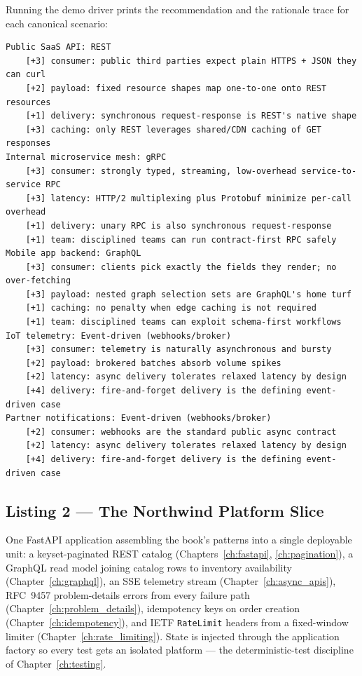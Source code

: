 Running the demo driver prints the recommendation and the rationale trace
for each canonical scenario:

\begin{verbatim}
Public SaaS API: REST
    [+3] consumer: public third parties expect plain HTTPS + JSON they can curl
    [+2] payload: fixed resource shapes map one-to-one onto REST resources
    [+1] delivery: synchronous request-response is REST's native shape
    [+3] caching: only REST leverages shared/CDN caching of GET responses
Internal microservice mesh: gRPC
    [+3] consumer: strongly typed, streaming, low-overhead service-to-service RPC
    [+3] latency: HTTP/2 multiplexing plus Protobuf minimize per-call overhead
    [+1] delivery: unary RPC is also synchronous request-response
    [+1] team: disciplined teams can run contract-first RPC safely
Mobile app backend: GraphQL
    [+3] consumer: clients pick exactly the fields they render; no over-fetching
    [+3] payload: nested graph selection sets are GraphQL's home turf
    [+1] caching: no penalty when edge caching is not required
    [+1] team: disciplined teams can exploit schema-first workflows
IoT telemetry: Event-driven (webhooks/broker)
    [+3] consumer: telemetry is naturally asynchronous and bursty
    [+2] payload: brokered batches absorb volume spikes
    [+2] latency: async delivery tolerates relaxed latency by design
    [+4] delivery: fire-and-forget delivery is the defining event-driven case
Partner notifications: Event-driven (webhooks/broker)
    [+2] consumer: webhooks are the standard public async contract
    [+2] latency: async delivery tolerates relaxed latency by design
    [+4] delivery: fire-and-forget delivery is the defining event-driven case
\end{verbatim}

\subsection{Listing 2 --- The Northwind Platform Slice}
\label{sec:code-platform}

One FastAPI application \cite{fastapidocs,pydanticdocs} assembling the
book's patterns into a single deployable unit: a keyset-paginated REST
catalog (Chapters~\ref{ch:fastapi}, \ref{ch:pagination}), a GraphQL read
model joining catalog rows to inventory availability
(Chapter~\ref{ch:graphql}), an SSE telemetry stream
(Chapter~\ref{ch:async_apis}), RFC~9457 problem-details errors from every
failure path \cite{rfc9457} (Chapter~\ref{ch:problem_details}), idempotency
keys on order creation (Chapter~\ref{ch:idempotency}), and IETF
\texttt{RateLimit} headers from a fixed-window limiter
\cite{ietf_ratelimit_headers} (Chapter~\ref{ch:rate_limiting}). State is
injected through the application factory so every test gets an isolated
platform --- the deterministic-test discipline of Chapter~\ref{ch:testing}.

